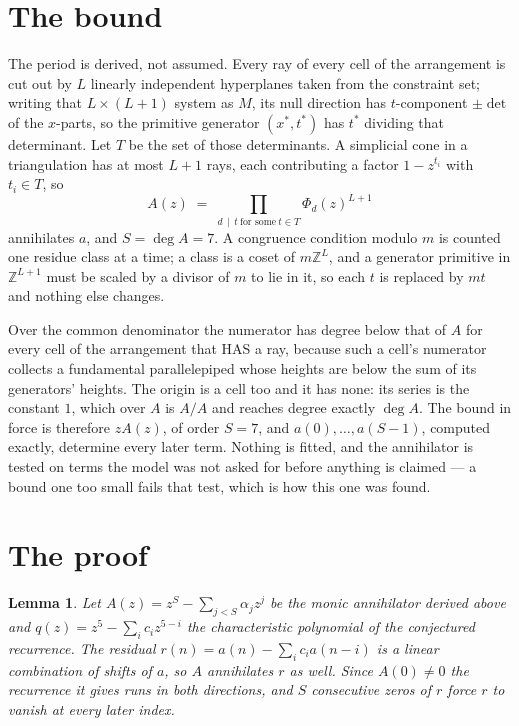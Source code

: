 \documentclass[11pt,a4paper]{article}
\theoremstyle{plain}
\newtheorem{lemma}[theorem]{Lemma}
\theoremstyle{definition}
\begin{document}
\section{The bound}

The period is derived, not assumed. Every ray of every cell of the arrangement is cut out by
$L$ linearly independent hyperplanes taken from the constraint set; writing that $L\times(L+1)$
system as $M$, its null direction has $t$-component $\pm\det$ of the $x$-parts, so the
primitive generator $(x^*,t^*)$ has $t^*$ dividing that determinant. Let $T$ be the set of
those determinants. A simplicial cone in a triangulation has at most $L+1$ rays, each
contributing a factor $1-z^{t_i}$ with $t_i\in T$, so
\[
A(z)\;=\;\prod_{d\,\mid\,t\ \text{for some}\ t\in T}\Phi_d(z)^{L+1}
\]
annihilates $a$, and $S=\deg A=7$. A congruence condition modulo $m$ is counted one residue
class at a time; a class is a coset of $m\mathbb{Z}^L$, and a generator primitive in
$\mathbb{Z}^{L+1}$ must be scaled by a divisor of $m$ to lie in it, so each $t$ is replaced
by $mt$ and nothing else changes.

Over the common denominator the numerator has degree below that of $A$ for every cell of the
arrangement that HAS a ray, because such a cell's numerator collects a fundamental
parallelepiped whose heights are below the sum of its generators' heights. The origin is a cell
too and it has none: its series is the constant $1$, which over $A$ is $A/A$ and reaches degree
exactly $\deg A$. The bound in force is therefore $zA(z)$, of order $S=7$, and
$a(0),\dots,a(S-1)$, computed exactly, determine every later term. Nothing is fitted, and the
annihilator is tested on terms the model was not asked for before anything is claimed --- a
bound one too small fails that test, which is how this one was found.

\section{The proof}

\begin{lemma}\label{lem:crit}
Let $A(z)=z^S-\sum_{j<S}\alpha_jz^{j}$ be the monic annihilator derived above and
$q(z)=z^{5}-\sum_ic_iz^{5-i}$ the characteristic polynomial of the conjectured
recurrence. The residual $r(n)=a(n)-\sum_ic_ia(n-i)$ is a linear combination of shifts of $a$,
so $A$ annihilates $r$ as well. Since $A(0)\ne0$ the recurrence it gives runs in both
directions, and $S$ consecutive zeros of $r$ force $r$ to vanish at every later index.
\end{lemma}
\end{document}
